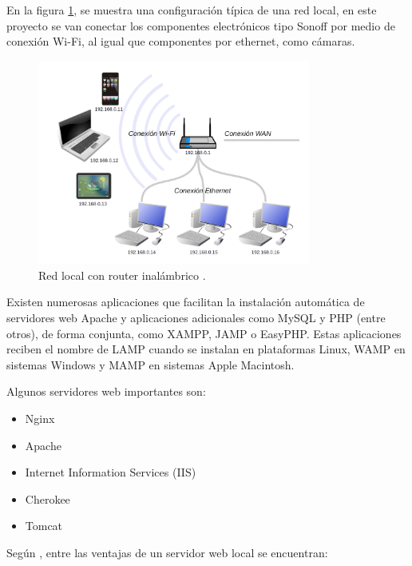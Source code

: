 En la figura \ref{F:RED}, se muestra una configuración típica de una red local, en este proyecto se van conectar los componentes electrónicos tipo Sonoff por medio de conexión Wi-Fi, al igual que componentes por ethernet, como cámaras. 

\begin{figure}[H]
\centering
\includegraphics[width=0.8\textwidth]{./imagenes/teoria/red_local.png} 
\caption{Red local con router inalámbrico \cite{Sanchez2018}.}
\label{F:RED}
\end{figure}

Existen numerosas aplicaciones que facilitan la instalación automática de servidores web Apache y aplicaciones adicionales como MySQL y PHP (entre otros), de forma conjunta, como XAMPP, JAMP o EasyPHP. Estas aplicaciones reciben el nombre de LAMP cuando se instalan en plataformas Linux, WAMP en sistemas Windows y MAMP en sistemas Apple Macintosh.

Algunos servidores web importantes son:

\begin{itemize}
\item Nginx
\item Apache
\item Internet Information Services (IIS)
\item Cherokee
\item Tomcat
\end{itemize}

Según \cite{Sanchez2018}, entre las ventajas de un servidor web local se encuentran:

